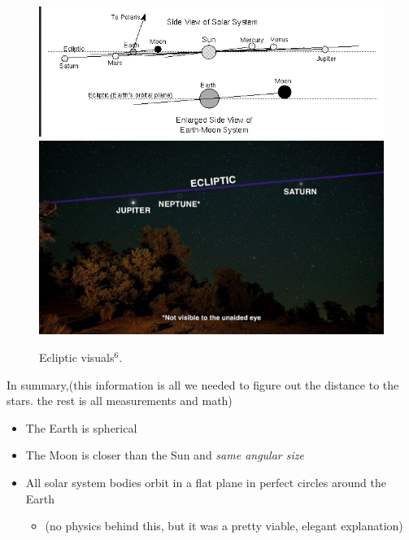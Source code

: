 \documentclass[12pt]{beamer}
\begin{document}
        \begin{frame} \centering
            \begin{figure}
                \includegraphics[scale=0.3, fbox]{ecliptic.png}\\
                \includegraphics[scale=0.08, fbox]{eclipticsky.jpg}
                \caption{Ecliptic visuals$^6$.}
            \end{figure}
        \end{frame}
        \begin{frame}{In summary,}{(this information is all we needed to figure out the distance to the stars. the rest is all measurements and math)}
            \begin{itemize}
                \item The Earth is spherical
                \item The Moon is closer than the Sun and \textit{same angular size}
                \item All solar system bodies orbit in a flat plane in perfect circles around the Earth
                \pause
                \begin{itemize}
                    \item (no physics behind this, but it was a pretty viable, elegant explanation)
                \end{itemize}
            \end{itemize}
        \end{frame}
\end{document}
